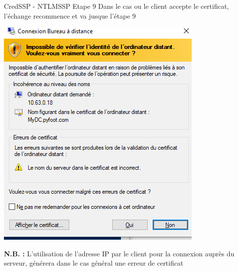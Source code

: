 \documentclass{beamer}
\begin{document}
\begin{frame}[fragile]{CredSSP - NTLMSSP Etape 9 }
Dans le cas ou le client accepte le certificat, l'échange recommence et va jusque l'étape 9 \newline
\begin{center}
 \includegraphics[scale=0.31]{Cert.png}
 \end{center}
 \textbf{N.B. :} L'utilisation de l'adresse IP par le client pour la connexion auprès du serveur, générera dans le cas général une erreur de certificat
\end{frame}
\end{document}
